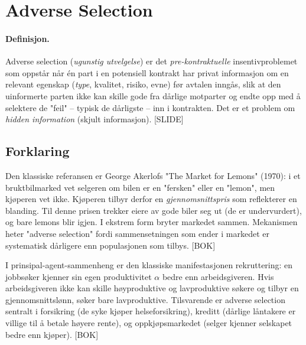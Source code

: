 \section{Adverse Selection}\label{thr:adverse-selection}

\paragraph{Definisjon.} Adverse selection (\emph{ugunstig utvelgelse}) er det \emph{pre-kontraktuelle} insentivproblemet som oppstår når én part i en potensiell kontrakt har privat informasjon om en relevant egenskap (\emph{type}, kvalitet, risiko, evne) før avtalen inngås, slik at den uinformerte parten ikke kan skille gode fra dårlige motparter og endte opp med å selektere de "feil" -- typisk de dårligste -- inn i kontrakten. Det er et problem om \emph{hidden information} (skjult informasjon). [SLIDE]

\subsection*{Forklaring}

Den klassiske referansen er George Akerlofs "The Market for Lemons" (1970): i et bruktbilmarked vet selgeren om bilen er en "fersken" eller en "lemon", men kjøperen vet ikke. Kjøperen tilbyr derfor en \emph{gjennomsnittspris} som reflekterer en blanding. Til denne prisen trekker eiere av gode biler seg ut (de er undervurdert), og bare lemons blir igjen. I ekstrem form bryter markedet sammen. Mekanismen heter "adverse selection" fordi sammensetningen som ender i markedet er systematisk dårligere enn populasjonen som tilbys. [BOK]

I prinsipal-agent-sammenheng er den klassiske manifestasjonen rekruttering: en jobbsøker kjenner sin egen produktivitet $\alpha$ bedre enn arbeidsgiveren. Hvis arbeidsgiveren ikke kan skille høyproduktive og lavproduktive søkere og tilbyr en gjennomsnittslønn, søker bare lavproduktive. Tilsvarende er adverse selection sentralt i forsikring (de syke kjøper helseforsikring), kreditt (dårlige låntakere er villige til å betale høyere rente), og oppkjøpsmarkedet (selger kjenner selskapet bedre enn kjøper). [BOK]


